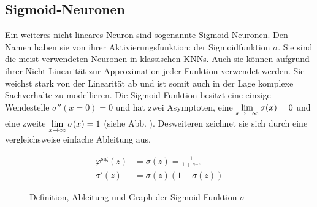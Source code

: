 \subsection{Sigmoid-Neuronen}
Ein weiteres nicht-lineares Neuron sind sogenannte Sigmoid-Neuronen.
Den Namen haben sie von ihrer Aktivierungsfunktion: der Sigmoidfunktion $\sigma$.
Sie sind die meist verwendeten Neuronen in klassischen KNNs.
Auch sie können aufgrund ihrer Nicht-Linearität zur Approximation jeder Funktion
verwendet werden. Sie weichst stark von der Linearität ab und ist
somit auch in der Lage komplexe Sachverhalte zu modellieren.
\para{}
Die Sigmoid-Funktion besitzt eine einzige Wendestelle $\sigma''(x=0)=0$ und hat
zwei Asymptoten, eine $\displaystyle\lim_{x \to -\infty} \sigma(x)=0$
und eine zweite $\displaystyle\lim_{x \to \infty} \sigma(x)=1$ (siehe Abb.
). Desweiteren zeichnet sie sich durch eine vergleichsweise
einfache Ableitung aus.
\\
\begin{figure}[h!]
  \begin{minipage}[h!]{0.5\textwidth}
    \begin{align*}
      \varphi^{\text{sig}}(z) &= \sigma(z) = \frac{1}{1 + e^{-z}}\\
      \sigma'(z)&=\sigma(z)(1-\sigma(z))
    \end{align*}
  \end{minipage}
  \begin{minipage}[h!]{0.5\textwidth}
    \centering
  \end{minipage}
  \caption{Definition, Ableitung und Graph der Sigmoid-Funktion $\sigma$}
  \label{fig:sigmoid}
\end{figure}

